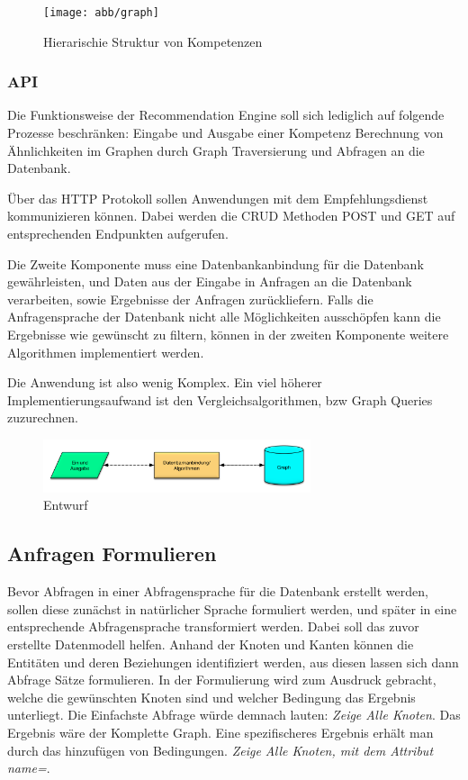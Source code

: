 \begin{figure}[htb]
 \centering
 \texttt{[image: abb/graph]}
 \caption[Beschreibung]{Hierarischie Struktur von Kompetenzen}
\label{fig:Beschreibung}
\end{figure}

\subsubsection{API}

 Die Funktionsweise der Recommendation Engine soll sich lediglich auf folgende Prozesse beschränken:
 \newline
 Eingabe und Ausgabe einer Kompetenz
Berechnung von Ähnlichkeiten im Graphen durch Graph Traversierung und Abfragen an die Datenbank.

Über das HTTP Protokoll sollen Anwendungen mit dem Empfehlungsdienst kommunizieren können. Dabei werden die CRUD Methoden POST und GET auf entsprechenden Endpunkten aufgerufen. 
\newline

Die Zweite Komponente muss eine Datenbankanbindung für die Datenbank gewährleisten, und Daten aus der Eingabe in Anfragen an die Datenbank verarbeiten, sowie Ergebnisse der Anfragen zurückliefern. Falls die Anfragensprache der Datenbank nicht alle Möglichkeiten ausschöpfen kann die Ergebnisse wie gewünscht zu filtern, können in der zweiten Komponente weitere Algorithmen implementiert werden.

Die Anwendung ist also wenig Komplex. Ein viel höherer Implementierungsaufwand ist den Vergleichsalgorithmen, bzw Graph Queries zuzurechnen. 

\begin{figure}[htb]
 \centering
 \includegraphics[width=0.7\textwidth,angle=0]{abb/entwurf}
 \caption[Beschreibung]{Entwurf}
\label{fig:Entwurf}
\end{figure}



\subsection{Anfragen Formulieren}

Bevor Abfragen in einer Abfragensprache für die Datenbank erstellt werden, sollen diese zunächst in natürlicher Sprache formuliert werden, und später in eine entsprechende Abfragensprache  transformiert werden. Dabei soll das zuvor erstellte  Datenmodell helfen. Anhand der Knoten und Kanten können die Entitäten und deren Beziehungen identifiziert werden, aus diesen lassen sich dann Abfrage Sätze formulieren. In der Formulierung wird zum Ausdruck gebracht, welche die gewünschten Knoten sind und welcher Bedingung das Ergebnis unterliegt. Die Einfachste Abfrage würde demnach lauten: \textit{Zeige Alle Knoten}. Das Ergebnis wäre der Komplette Graph. Eine spezifischeres Ergebnis erhält man durch das hinzufügen von Bedingungen. \textit{  Zeige Alle Knoten, mit dem Attribut {name=\textbf{\texttt{}}}}. 


